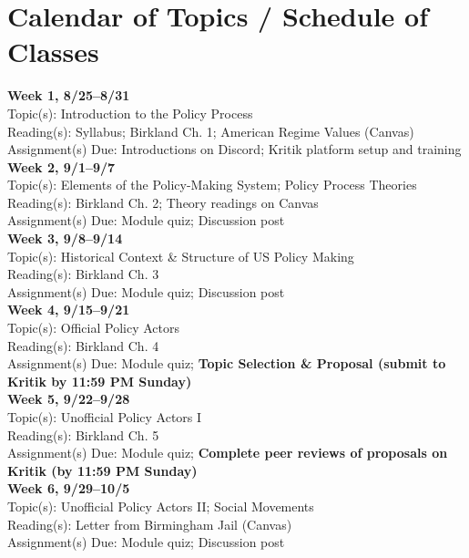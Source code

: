 \documentclass[12pt]{article}     %
\begin{document}
\section{Calendar of Topics / Schedule of Classes}

\noindent \textbf{Week 1, 8/25--8/31}\\
Topic(s): Introduction to the Policy Process\\
Reading(s): Syllabus; Birkland Ch. 1; American Regime Values (Canvas)\\
Assignment(s) Due: Introductions on Discord; Kritik platform setup and training\\

\noindent \textbf{Week 2, 9/1--9/7}\\
Topic(s): Elements of the Policy-Making System; Policy Process Theories\\
Reading(s): Birkland Ch. 2; Theory readings on Canvas\\
Assignment(s) Due: Module quiz; Discussion post\\

\noindent \textbf{Week 3, 9/8--9/14}\\
Topic(s): Historical Context \& Structure of US Policy Making\\
Reading(s): Birkland Ch. 3\\
Assignment(s) Due: Module quiz; Discussion post\\

\noindent \textbf{Week 4, 9/15--9/21}\\
Topic(s): Official Policy Actors\\
Reading(s): Birkland Ch. 4\\
Assignment(s) Due: Module quiz; \textbf{Topic Selection \& Proposal (submit to Kritik by 11:59 PM Sunday)}\\

\noindent \textbf{Week 5, 9/22--9/28}\\
Topic(s): Unofficial Policy Actors I\\
Reading(s): Birkland Ch. 5\\
Assignment(s) Due: Module quiz; \textbf{Complete peer reviews of proposals on Kritik (by 11:59 PM Sunday)}\\

\noindent \textbf{Week 6, 9/29--10/5}\\
Topic(s): Unofficial Policy Actors II; Social Movements\\
Reading(s): Letter from Birmingham Jail (Canvas)\\
Assignment(s) Due: Module quiz; Discussion post\\
\end{document}
